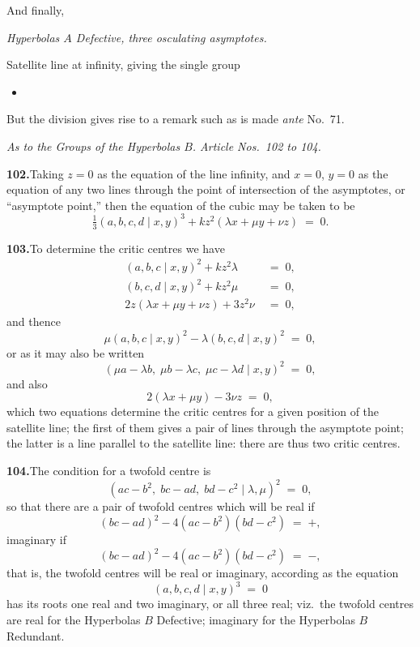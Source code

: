\documentclass[11pt]{article}
\begin{document}
And finally,
\smallskip

\noindent\emph{Hyperbolas $A$ Defective, three osculating asymptotes.}

Satellite line at infinity, giving the single group
\begin{itemize}\itemsep0pt
\item[XXXV.]
\end{itemize}
But the division gives rise to a remark such as is made \emph{ante} No.~71.

\bigskip
\noindent\textit{As to the Groups of the Hyperbolas $B$. Article Nos.~102 to 104.}

\medskip
\textbf{102.}\quad Taking $z = 0$ as the equation of the line infinity, and $x = 0$, $y = 0$ as the equation of any two lines through the point of intersection of the asymptotes, or ``asymptote point,'' then the equation of the cubic may be taken to be
\[
\tfrac{1}{3}(a, b, c, d \mid x, y)^{3} + k z^{2}(\lambda x + \mu y + \nu z) \;=\; 0.
\]

\medskip
\textbf{103.}\quad To determine the critic centres we have
\begin{align*}
(a, b, c \mid x, y)^{2} + k z^{2} \lambda &\;=\; 0,\\
(b, c, d \mid x, y)^{2} + k z^{2} \mu &\;=\; 0,\\
2 z(\lambda x + \mu y + \nu z) + 3 z^{2} \nu &\;=\; 0,
\end{align*}
and thence
\[
\mu(a, b, c \mid x, y)^{2} - \lambda(b, c, d \mid x, y)^{2} \;=\; 0,
\]
or as it may also be written
\[
(\mu a - \lambda b,\; \mu b - \lambda c,\; \mu c - \lambda d \mid x, y)^{2} \;=\; 0,
\]
and also
\[
2(\lambda x + \mu y) - 3 \nu z \;=\; 0,
\]
which two equations determine the critic centres for a given position of the satellite line; the first of them gives a pair of lines through the asymptote point; the latter is a line parallel to the satellite line: there are thus two critic centres.

\medskip
\textbf{104.}\quad The condition for a twofold centre is
\[
(a c - b^{2},\; b c - a d,\; b d - c^{2} \mid \lambda, \mu)^{2} \;=\; 0,
\]
so that there are a pair of twofold centres which will be real if
\[
(b c - a d)^{2} - 4(a c - b^{2})(b d - c^{2}) \;=\; +,
\]
imaginary if
\[
(b c - a d)^{2} - 4(a c - b^{2})(b d - c^{2}) \;=\; -,
\]
that is, the twofold centres will be real or imaginary, according as the equation
\[
(a, b, c, d \mid x, y)^{3} \;=\; 0
\]
has its roots one real and two imaginary, or all three real; viz.\ the twofold centres are real for the Hyperbolas $B$ Defective; imaginary for the Hyperbolas $B$ Redundant.
\end{document}
